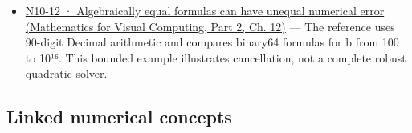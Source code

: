 \begin{itemize}
\item
  \href{../02-Mathematics-for-Visual-Computing-P02/main.pdf\#nameddest=02-foundations-ii-ch028-figure-n10-12-algebraically-equal-formulas-can-have-unequal-numerical-error}{N10-12 · Algebraically equal formulas can have unequal numerical error (Mathematics for Visual Computing, Part 2, Ch. 12)} --- The reference uses 90-digit Decimal arithmetic and compares binary64 formulas for b from 100 to 10¹⁶. This bounded example illustrates cancellation, not a complete robust quadratic solver.
\end{itemize}

\subsection{Linked numerical concepts}\label{appendix-cb5af353ef77-linked-numerical-concepts}

\hypertarget{appendix-cb5af353ef77-linked-numerical-concepts}{}

